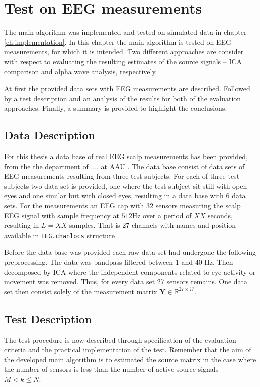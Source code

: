 \chapter{Test on EEG measurements}\label{ch:eeg_test}
The main algorithm was implemented and tested on simulated data in chapter \ref{ch:implementation}. 
In this chapter the main algorithm is tested on EEG measurements, for which it is intended. 
Two different approaches are consider with respect to evaluating the resulting estimates of the source signals -- ICA comparison and alpha wave analysis, respectively.

At first the provided data sets with EEG measurements are described. Followed by a test description and an analysis of the results for both of the evaluation approaches. 
Finally, a summary is provided to highlight the conclusions.  

\section{Data Description}
For this thesis a data base of real EEG scalp measurements has been provided, from the the department of .... at AAU . 
The data base consist of data sets of EEG measurements resulting from three test subjects. 
For each of three test subjects two data set is provided, one where the test subject sit still with open eyes and one similar but with closed eyes, resulting in a data base with 6 data sets.  
For the measurements an EEG cap with $32$ sensors measuring the scalp EEG signal with sample frequency at $512$Hz over a period of $XX$ seconds, resulting in $L = XX$ samples. 
That is 27 channels with names and position available in \texttt{EEG.chanlocs} structure .   

Before the data base was provided each raw data set had undergone the following preprocessing.
The data was bandpass filtered between 1 and 40 Hz. Then decomposed by ICA where the independent components related to eye activity or movement was removed. Thus, for every data set 27 sensors remains. One data set then consist solely of the measurement matrix $\mathbf{Y} \in \mathbb{R}^{27\times ??}$.


\section{Test Description}\label{seg:main_test_description}
The test procedure is now described through specification of the evaluation criteria and the practical implementation of the test.
Remember that the aim of the developed main algorithm is to estimated the source matrix in the case where the number of sensors is less than the number of active source signals -- $M<k\leq N$.

